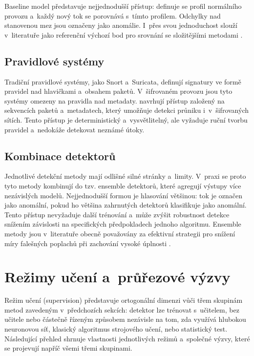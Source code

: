 Baseline model představuje nejjednodušší přístup: definuje se profil normálního provozu a~každý nový tok se porovnává s~tímto profilem. Odchylky nad stanovenou mez jsou označeny jako anomálie. I~přes svou jednoduchost slouží v~literatuře jako referenční výchozí bod pro srovnání se složitějšími metodami \parencite{OzkanOkay2021}.

\subsection{Pravidlové systémy}
\label{sec:pravidlove}

Tradiční pravidlové systémy, jako Snort a~Suricata, definují signatury ve formě pravidel nad hlavičkami a~obsahem paketů. V~šifrovaném provozu jsou tyto systémy omezeny na pravidla nad metadaty. \textcite{Papadogiannaki2022} navrhují přístup založený na sekvencích paketů a~metadatech, který umožňuje detekci průniku i~v~šifrovaných sítích. Tento přístup je deterministický a~vysvětlitelný, ale vyžaduje ruční tvorbu pravidel a~nedokáže detekovat neznámé útoky.

\subsection{Kombinace detektorů}
\label{sec:kombinace}

Jednotlivé detekční metody mají odlišné silné stránky a~limity. V~praxi se proto tyto metody kombinují do tzv. ensemble detektorů, které agregují výstupy více nezávislých modelů. Nejjednodušší formou je hlasování většinou: tok je označen jako anomální, pokud ho většina zahrnutých detektorů klasifikuje jako anomální. Tento přístup nevyžaduje další trénování a~může zvýšit robustnost detekce snížením závislosti na specifických předpokladech jednoho algoritmu. Ensemble metody jsou v~literatuře obecně považovány za efektivní strategii pro snížení míry falešných poplachů při zachování vysoké úplnosti \parencite{OzkanOkay2021}.

\section{Režimy učení a~průřezové výzvy}
\label{sec:rezimy-uceni}

Režim učení (supervision) představuje ortogonální dimenzi vůči třem skupinám metod zavedeným v~předchozích sekcích: detektor lze trénovat s~učitelem, bez učitele nebo částečně řízeným způsobem nezávisle na tom, zda využívá hlubokou neuronovou síť, klasický algoritmus strojového učení, nebo statistický test. Následující přehled shrnuje vlastnosti jednotlivých režimů a~společné výzvy, které se projevují napříč všemi třemi skupinami.

